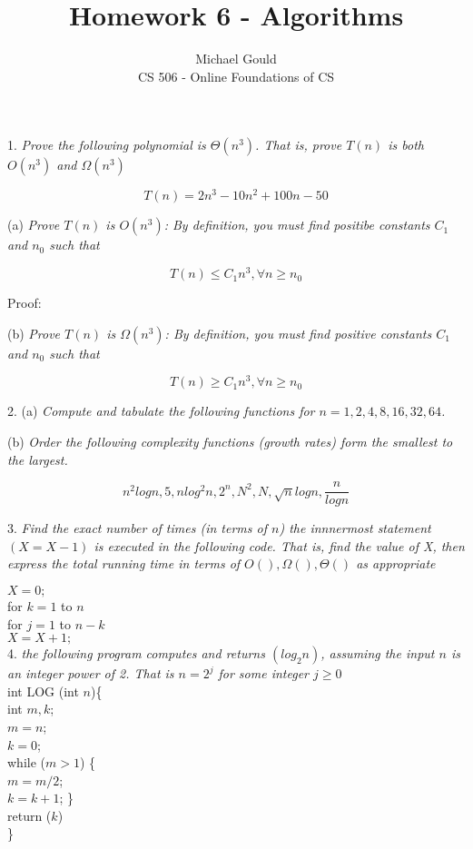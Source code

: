 \documentclass[10pt]{article}
\newcommand\tab[1][.5cm]{\hspace*{#1}}
\begin{document}
\title{Homework 6 - Algorithms}
\author{Michael Gould\\ 
CS 506 - Online Foundations of CS}

\maketitle

1. \textit{Prove the following polynomial is $\Theta(n^3)$.  That is, prove $T(n)$ is both $O(n^3)$ and $\Omega(n^3)$}

$$T(n) = 2n^3 - 10n^2 + 100n - 50$$

(a) \textit{Prove $T(n)$ is $O(n^3)$: By definition, you must find positibe constants $C_1$ and $n_0$ such that}

$$T(n) \leq C_1n^3, \forall n \geq n_0$$

Proof: 

(b) \textit{Prove $T(n)$ is $\Omega(n^3)$: By definition, you must find positive constants $C_1$ and $n_0$ such that}

$$T(n) \geq C_1n^3, \forall n \geq n_0$$

2. (a) \textit{Compute and tabulate the following functions for $ n=1,2,4,8,16,32,64$.}

(b) \textit{Order the following complexity functions (growth rates) form the smallest to the largest.}

$$n^2 log n, 5, n log^2 n, 2^n, N^2, N, \sqrt{n} log n, \frac{n}{log n}$$

3. \textit{Find the exact number of times (in terms of $n$) the innnermost statement $(X=X-1)$ is executed in the following code.  That is, find the value of X, then express the total running time in terms of $O(),\Omega(),\Theta()$ as appropriate}

$X = 0;$\\
  \tab for $k=1$ to $n$\\
  \tab \tab for $j=1$ to $n-k$\\
  \tab \tab \tab $X=X+1;$\\

4. \textit{the following program computes and returns $(log_2n)$, assuming the input $n$ is an integer power of 2.  That is $n=2^j$ for some integer $j\geq0$}\\
\tab int LOG (int $n$)\{\\
\tab int $m,k$;\\
\tab $m=n$;\\
\tab $k=0$;\\
\tab while ($m>1$) \{\\
\tab \tab $m=m/2$;\\
\tab \tab $k=k+1$; \}\\
\tab return ($k$)\\
\tab \}
\end{document}
